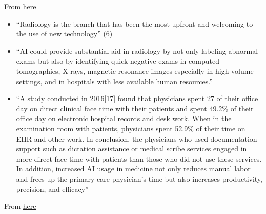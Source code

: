 \documentclass[11pt]{article}
\begin{document}
From \href{https://www.ncbi.nlm.nih.gov/pmc/articles/PMC6691444/pdf/JFMPC-8-2328.pdf}{here}~\cite{overview-of-ai-medicine}

\begin{itemize}
    \item ``Radiology is the branch that has been the most upfront
    and welcoming to the use of new technology'' (6)
    \item ``AI could provide substantial aid in radiology by not
    only labeling abnormal exams but also by identifying quick negative
    exams in computed tomographies, X‑rays, magnetic resonance
    images especially in high volume settings, and in hospitals with
    less available human resources.''
    \item  ``A study conducted in 2016[17] found that physicians spent 27%
    of their office day on direct clinical face time with their patients
    and spent 49.2\% of their office day on electronic hospital records
    and desk work. When in the examination room with patients,
    physicians spent 52.9\% of their time on EHR and other work. In
    conclusion, the physicians who used documentation support such
    as dictation assistance or medical scribe services engaged in more
    direct face time with patients than those who did not use these
    services. In addition, increased AI usage in medicine not only
    reduces manual labor and frees up the primary care physician’s
    time but also increases productivity, precision, and efficacy''
\end{itemize}

From \href{https://onlinelibrary.wiley.com/doi/10.1002/cac2.12215}{here}~\cite{AI-in-cancer-diagnosis-era}
\end{document}
